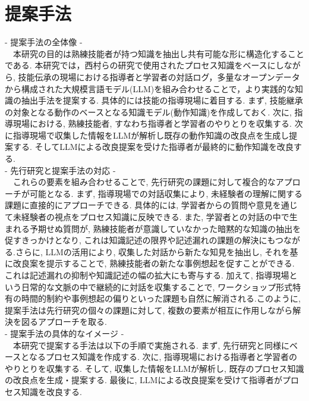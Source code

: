 \chapter{提案手法}
- 提案手法の全体像 -\\
　本研究の目的は熟練技能者が持つ知識を抽出し共有可能な形に構造化することである. 本研究では，西村らの研究\cite{Nishimura2017}で使用されたプロセス知識をベースにしながら, 技能伝承の現場における指導者と学習者の対話ログ，多量なオープンデータから構成された大規模言語モデル(LLM)を組み合わせることで，より実践的な知識の抽出手法を提案する. 具体的には技能の指導現場に着目する. まず, 技能継承の対象となる動作のベースとなる知識モデル(動作知識)を作成しておく. 次に, 指導現場における, 熟練技能者, すなわち指導者と学習者のやりとりを収集する. 次に指導現場で収集した情報をLLMが解析し既存の動作知識の改良点を生成し提案する. そしてLLMによる改良提案を受けた指導者が最終的に動作知識を改良する.\\

- 先行研究と提案手法の対応 -\\
　これらの要素を組み合わせることで, 先行研究の課題に対して複合的なアプローチが可能となる. まず, 指導現場での対話収集により, 未経験者の理解に関する課題に直接的にアプローチできる. 具体的には, 学習者からの質問や意見を通じて未経験者の視点をプロセス知識に反映できる. また, 学習者との対話の中で生まれる予期せぬ質問が, 熟練技能者が意識していなかった暗黙的な知識の抽出を促すきっかけとなり, これは知識記述の限界や記述漏れの課題の解決にもつながる.さらに, LLMの活用により, 収集した対話から新たな知見を抽出し, それを基に改良案を提示することで, 熟練技能者の新たな事例想起を促すことができる. これは記述漏れの抑制や知識記述の幅の拡大にも寄与する. 加えて, 指導現場という日常的な文脈の中で継続的に対話を収集することで, ワークショップ形式特有の時間的制約や事例想起の偏りといった課題も自然に解消される.このように, 提案手法は先行研究の個々の課題に対して, 複数の要素が相互に作用しながら解決を図るアプローチを取る.\\


- 提案手法の具体的なイメージ -\\
　本研究で提案する手法は以下の手順で実施される. まず, 先行研究と同様にベースとなるプロセス知識を作成する. 次に, 指導現場における指導者と学習者のやりとりを収集する. そして, 収集した情報をLLMが解析し, 既存のプロセス知識の改良点を生成・提案する. 最後に, LLMによる改良提案を受けて指導者がプロセス知識を改良する.\\